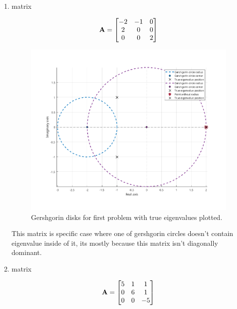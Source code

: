 \begin{enumerate}
    \item matrix 
    
    \begin{equation*}
        \mathbf{A} = 
        \begin{bmatrix}
            -2 & -1 &  0\\
            2 &  0 &  0\\
            0 &  0 &  2 
        \end{bmatrix}
    \end{equation*}

    \begin{figure}[H]
        \centering
        \includegraphics[width=1\textwidth]{problems/Figures/Problem_7/first_matrix.png}
        \caption{Gershgorin disks for first problem with true eigenvalues plotted.}
        \label{fig:Inverse}
    \end{figure}
    This matrix is specific case where one of gershgorin circles doesn't contain eigenvalue inside of it, its mostly because this matrix isn't diagonally dominant.
    \item matrix
    
    \begin{equation*}
        \mathbf{A} = 
        \begin{bmatrix}
            5 & 1 &  1\\
            0 & 6 &  1\\
            0 & 0 &  -5 
        \end{bmatrix}
    \end{equation*}


\end{enumerate}
